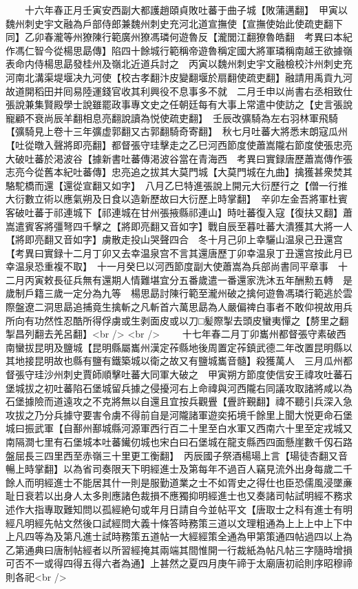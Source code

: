 　　十六年春正月壬寅安西副大都護趙頤貞敗吐蕃于曲子城【敗蒲邁翻】　甲寅以魏州刺史宇文融為戶部侍郎兼魏州刺史充河北道宣撫使【宣撫使始此使疏吏翻下同】乙卯春瀧等州獠陳行範廣州獠馮璘何遊魯反【瀧閭江翻獠魯皓翻　考異曰本紀作馮仁智今從楊思勗傳】陷四十餘城行範稱帝遊魯稱定國大將軍璘稱南越王欲據嶺表命内侍楊思勗發桂州及嶺北近道兵討之　丙寅以魏州刺史宇文融檢校汴州刺史充河南北溝渠堤堰决九河使【校古孝翻汴皮變翻堰於扇翻使疏吏翻】融請用禹貢九河故道開稻田并囘易陸運錢官收其利興役不息事多不就　二月壬申以尚書右丞相致仕張說兼集賢殿學士說雖罷政事專文史之任朝廷每有大事上常遣中使訪之【史言張說寵顧不衰尚辰羊翻相息亮翻說讀為悦使疏吏翻】　壬辰改彍騎為左右羽林軍飛騎【彍騎見上卷十三年彍虚郭翻又古郭翻騎奇寄翻】　秋七月吐蕃大將悉末朗寇瓜州【吐從暾入聲將即亮翻】都督張守珪擊走之乙巳河西節度使蕭嵩隴右節度使張忠亮大破吐蕃於渇波谷【據新書吐蕃傳渇波谷當在青海西　考異曰實録唐歷蕭嵩傳作張志亮今從舊本紀吐蕃傳】忠亮追之拔其大莫門城【大莫門城在九曲】擒獲甚衆焚其駱駝橋而還【還從宣翻又如字】　八月乙巳特進張說上開元大衍歷行之【僧一行推大衍數立術以應氣朔及日食以造新歷故曰大衍歷上時掌翻】　辛卯左金吾將軍杜賓客破吐蕃于祁連城下【祁連城在甘州張掖縣祁連山】時吐蕃復入寇【復扶又翻】蕭嵩遣賓客將彊弩四千擊之【將即亮翻又音如字】戰自辰至暮吐蕃大潰獲其大將一人【將即亮翻又音如字】虜散走投山哭聲四合　冬十月己卯上幸驪山温泉己丑還宫　【考異曰實録十二月丁卯又去幸温泉宫不言其還唐歷丁卯幸温泉丁丑還宫按此月已幸温泉恐重複不取】　十一月癸巳以河西節度副大使蕭嵩為兵部尚書同平章事　十二月丙寅敕長征兵無有還期人情難堪宜分五番歲遣一番還家洗沐五年酬勲五轉　是歲制戶籍三歲一定分為九等　楊思勗討陳行範至瀧州破之擒何遊魯馮璘行範逃於雲際盤遼二洞思勗追捕竟生擒斬之凡斬首六萬思勗為人嚴偏禆白事者不敢仰視故用兵所向有功然性忍酷所得俘虜或生剥面皮或以刀□髪際掣去頭皮蠻夷憚之【剺里之翻掣昌列翻去羌呂翻】<br />
<br />
　　十七年春二月丁卯巂州都督張守素破西南蠻拔昆明及鹽城【昆明縣屬巂州漢定莋縣地後周置定莋鎮武德二年改置昆明縣以其地接昆明故也縣有鹽有鐵築城以衛之故又有鹽城巂音髓】殺獲萬人　三月瓜州都督張守珪沙州刺史賈師順擊吐蕃大同軍大破之　甲寅朔方節度使信安王禕攻吐蕃石堡城拔之初吐蕃陷石堡城留兵據之侵擾河右上命禕與河西隴右同議攻取諸將咸以為石堡據險而道遠攻之不克將無以自還且宜按兵觀舋【舋許覲翻】禕不聽引兵深入急攻拔之乃分兵據守要害令虜不得前自是河隴諸軍遊奕拓境千餘里上聞大悦更命石堡城曰振武軍【自鄯州鄯城縣河源軍西行百二十里至白水軍又西南六十里至定戎城又南隔澗七里有石堡城本吐蕃䥫仞城也宋白曰石堡城在龍支縣西四面懸崖數千仭石路盤屈長三四里西至赤嶺三十里更工衡翻】　丙辰國子祭酒楊瑒上言【瑒徒杏翻又音暢上時掌翻】以為省司奏限天下明經進士及第每年不過百人竊見流外出身每歲二千餘人而明經進士不能居其什一則是服勤道業之士不如胥史之得仕也臣恐儒風浸墜亷耻日衰若以出身人太多則應諸色裁損不應獨抑明經進士也又奏諸司帖試明經不務求述作大指專取難知問以孤經絶句或年月日請自今並帖平文【唐取士之科有進士有明經凡明經先帖文然後口試經問大義十條答時務策三道以文理粗通為上上上中上下中上凡四等為及第凡進士試時務策五道帖一大經經策全通為甲第策通四帖過四以上為乙第通典曰唐制帖經者以所習經掩其兩端其間惟開一行裁紙為帖凡帖三字隨時增損可否不一或得四得五得六者為通】上甚然之夏四月庚午禘于太廟唐初祫則序昭穆禘則各祀<br />
